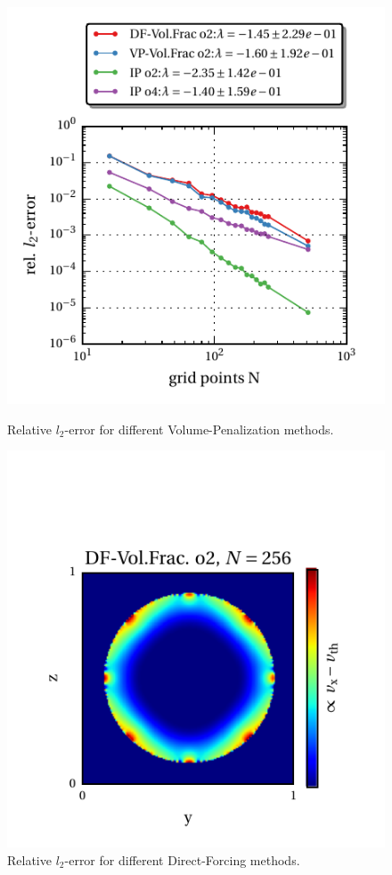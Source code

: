 \begin{figure}[!bp]
  \begin{minipage}[c]{0.5\textwidth}
      \includegraphics{gfx/immersed_boundary/hpflow/hd/all.pdf}
      \caption{Relative $l_2$-error for different Volume-Penalization methods.}
  \end{minipage}
  \begin{minipage}[c]{0.5\textwidth}
      \includegraphics{gfx/immersed_boundary/hpflow/hd/example.pdf}
      \caption{Relative $l_2$-error for different Direct-Forcing methods.}
  \end{minipage}
\end{figure}

